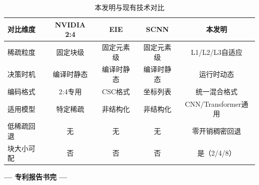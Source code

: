 \documentclass[a4paper,12pt,fontset=ubuntu]{ctexart}
\begin{document}
\begin{table}[htbp]
\centering
\caption{本发明与现有技术对比}
\begin{tabular}{lcccc}
\toprule
\textbf{对比维度} & \textbf{NVIDIA 2:4} & \textbf{EIE} & \textbf{SCNN} & \textbf{本发明} \\
\midrule
稀疏粒度     & 固定块级   & 固定元素级 & 固定元素级 & L1/L2/L3自适应 \\
决策时机     & 编译时静态 & 编译时静态 & 编译时静态 & 运行时动态 \\
编码格式     & 2:4专用    & CSC格式   & 坐标列表   & 统一混合格式 \\
适用模型     & 特定稀疏   & 非结构化  & 非结构化   & CNN/Transformer通用 \\
低稀疏回退   & 无         & 无        & 无        & 零开销稠密回退 \\
块大小可配   & 否         & 否        & 否        & 是（2/4/8） \\
\bottomrule
\end{tabular}
\end{table}

\vspace{2em}
\begin{center}
\textbf{--- 专利报告书完 ---}
\end{center}
\end{document}
